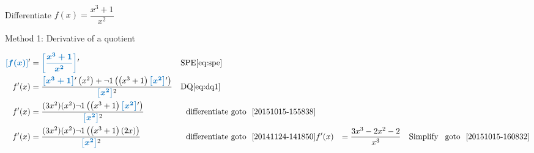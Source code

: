 \documentclass[20150903-160354-rs2.2-MarksMathNotebook.tex]{subfiles}
\begin{document}
\begin{example}[id:20151015-153507] \label{20151015-153507} \hfill \\
Differentiate $f(x)=\dfrac{x^3+1}{x^2}$

\soln

\solnsteps

Method 1: Derivative of a quotient

\begin{align*}
\farg{f(x)}' &= \farg{\dfrac{x^3+1}{x^2}}' && \text{SPE} \eqref{eq:spe} \\
f'(x) &= \dfrac{\farg{x^3+1}^\prime \left(x^2\right) + \neg 1 \left( \left(x^3+1 \right) \farg{x^2}' \right)}{\farg{x^2}^2} && \text{DQ} \eqref{eq:dq1} \\
f'(x) &= \dfrac{(3x^2)(x^2) \neg 1 \left( \left(x^3+1 \right) \farg{x^2}' \right)}{\farg{x^2}^2} &&  \, \text{\, differentiate goto \,} \, \ref{20151015-155838} \\
f'(x) &= \dfrac{(3x^2)(x^2) \neg 1 \left( \left(x^3+1 \right) (2x) \right)}{\farg{x^2}^2} &&  \, \text{\, differentiate goto \,} \, \ref{20141124-141850}
f'(x) &= \dfrac{3x^3-2x^2-2}{x^3} && \text{Simplify \, goto \,} \, \ref{20151015-160832}
\end{align*}
\end{example}
\end{document}
